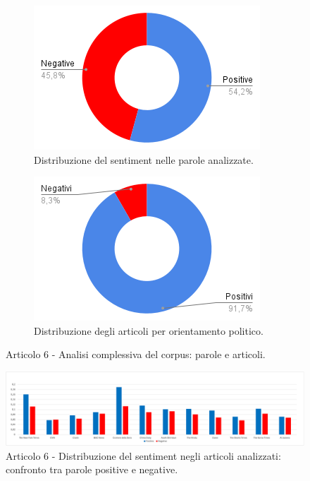 \begin{figure}[H]
    \centering
    \begin{subfigure}[t]{0.48\textwidth}
        \centering
        \includegraphics[width=\linewidth]{Immagini//Articolo6/Articolo 6 - Rapporto Totale Parole.png}
        \caption{Distribuzione del sentiment nelle parole analizzate.}
        \label{fig:totale-parole-a6}
    \end{subfigure}
    \hfill
    \begin{subfigure}[t]{0.48\textwidth}
        \centering
        \includegraphics[width=\linewidth]{Immagini//Articolo6/Articolo 6 - Rapporto Totale Articoli.png}
        \caption{Distribuzione degli articoli per orientamento politico.}
        \label{fig:totale-articoli-a6}
    \end{subfigure}
    \caption{Articolo 6 - Analisi complessiva del corpus: parole e articoli.}
    \label{fig:analisi-totale-a6}

    \centering
    \includegraphics[width=1\linewidth]{Immagini//Articolo6/Articolo 6 - Analisi Grafica Risultati Totali.png}
    \caption{Articolo 6 - Distribuzione del sentiment negli articoli analizzati: confronto tra parole positive e negative.}
    \label{fig:risultati-totali-a6}
\end{figure}

